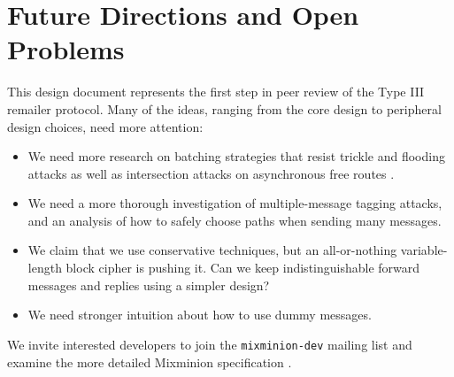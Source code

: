 \documentclass[11pt]{IEEEtran}
\begin{document}

\section{Future Directions and Open Problems}
\label{sec:conclusion}

This design document represents the first step in peer review of the
Type III remailer protocol. Many of the ideas, ranging from the core
design to peripheral design choices, need more attention:

\begin{itemize}
\item We need more research on batching strategies that resist trickle
and flooding attacks \cite{batching-taxonomy} as well as intersection
attacks on asynchronous free routes \cite{disad-free-routes}.
\item We need a more thorough investigation of multiple-message tagging
attacks, and an analysis of how to safely choose paths when
sending many messages.
\item We claim that we use conservative techniques, but an all-or-nothing
variable-length block cipher is pushing it. Can we keep indistinguishable
forward messages and replies using a simpler design?
\item We need stronger intuition about how to use
dummy messages.
\end{itemize}

We invite interested developers to join the {\tt mixminion-dev}
mailing list \cite{mixminion-dev} and examine the more detailed Mixminion
specification \cite{mixminion-spec}.







\end{document}

